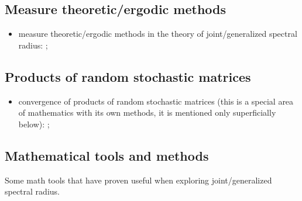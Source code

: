 \documentclass[a4paper,fleqn]{article}
\let\cite=\citep
\begin{document}
\subsection*{Measure theoretic/ergodic methods}
\begin{itemize}
  \item measure theoretic/ergodic methods in the theory of joint/generalized
        spectral radius: \cite{AltPar:CDC19, AltPar:SIAMJCO20, BochiRams:JMD16,
          BG:JEP19, BM:JAMS02, Dai:N11, Dai:JDE11, Dai:LAA12, Dai:JFI14,
          DHX:SIAMJCO08, DHX:CDC08, DHX:ArXiv11-1, DHX:ERA11, DHX:AUT11,
          DHX:PAMS13, DHX:IEEETAC15, Gomes:2017, KM:ArXiv25, Moh:JSP22,
          Morris:ADVM10, Morris:JFA12, Morris:PLMS13, Morris:EDTS17,
          Morris:EDTS17-2, NSch:LAA99, OgurMart:LAA14, ZCL:DCDSA18};
\end{itemize}

\subsection*{Products of random stochastic matrices}
\begin{itemize}
  \item convergence of products of random stochastic matrices (this is a
        special area of mathematics with its own methods, it is mentioned only
        superficially below): \cite{AT:JMAA77, BXMS:IEEETSP13, Cohn:IJMMS,
          CMS:LAA21, CMMS:EJP23, DHH:ArXiv14, DHX:AUT11, OgurMart:LAA13,
          Leiz:LAA92, LimaRah:JPA94, Prot:MS11, Thomas:ArXiv11, Thomas:ArXiv13,
          Wolf:PAMS};
\end{itemize}

\subsection*{Mathematical tools and methods}
Some math tools that have proven useful when exploring
joint/generalized spectral radius.
\end{document}
